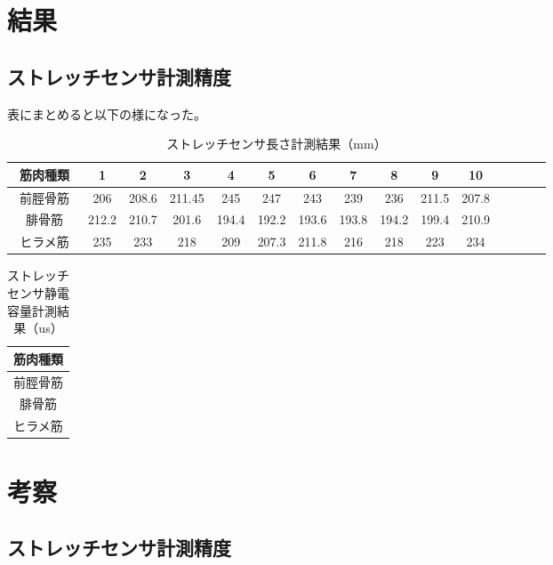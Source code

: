 \section{結果}
\subsection{ストレッチセンサ計測精度}
表にまとめると以下の様になった。
\begin{table}[htb]
    \caption{ストレッチセンサ長さ計測結果（mm）}
    \begin{tabular}{|c|c|c|c|c|c|c|c|c|c|c|c|c|c|c|}\hline
        筋肉種類 & 1 & 2 & 3 & 4 & 5 & 6 & 7 & 8 & 9 & 10\\ \hline
        前脛骨筋　& 206 & 208.6 & 211.45 & 245 & 247 & 243 & 239 & 236 & 211.5 & 207.8 \\ \hline
        腓骨筋 & 212.2 & 210.7 & 201.6 & 194.4 & 192.2 & 193.6 & 193.8 & 194.2 & 199.4 & 210.9\\ \hline
        ヒラメ筋 & 235 & 233 & 218 & 209 & 207.3 & 211.8 & 216 & 218 & 223 & 234 \\ \hline
    \end{tabular}
\end{table}
\begin{table}[htb]
    \caption{ストレッチセンサ静電容量計測結果（us）}
    \begin{tabular}{|c|}\hline
        筋肉種類 \\ \hline
        前脛骨筋 \\ \hline
        腓骨筋 \\ \hline
        ヒラメ筋 \\ \hline
    \end{tabular}
\end{table}
\section{考察}
\subsection{ストレッチセンサ計測精度}